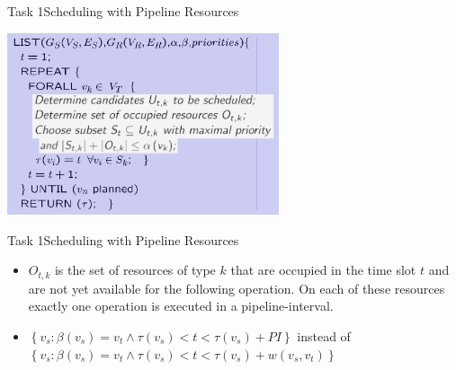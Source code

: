 \begin{frame}[fragile]{Task 1}{Scheduling with Pipeline Resources}
  \begin{solutionnoinc}
    \centering
    \includegraphics[width=0.6\textwidth]{./figures/list_scheduling.png}
  \end{solutionnoinc}
\end{frame}
\begin{frame}[fragile]{Task 1}{Scheduling with Pipeline Resources}
  \begin{solutionnoinc}
    \begin{itemize}
      \item $O_{t, k}$ is the set of resources of type $k$ that are occupied in the time slot $t$ and are not yet available for the following operation. On each of these resources exactly one operation is executed in a pipeline-interval.
      \item $\left\{v_s: \beta\left(v_s\right)=v_t \wedge \tau\left(v_s\right)<t<\tau\left(v_s\right)+PI\right\}$ instead of $\left\{v_s: \beta\left(v_s\right)=v_t \wedge \tau\left(v_s\right)<t<\tau\left(v_s\right)+w\left(v_s, v_t\right)\right\}$
    \end{itemize}
  \end{solutionnoinc}
\end{frame}
